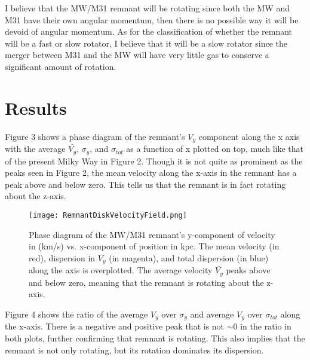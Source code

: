 \documentclass[twocolumn]{aastex63}
\begin{document}
I believe that the MW/M31 remnant will be rotating since both the MW and M31 have their own angular momentum, then there is no possible way it will be devoid of angular momentum.  As for the classification of whether the remnant will be a fast or slow rotator, I believe that it will be a slow rotator since the merger between M31 and the MW will have very little gas to conserve a significant amount of rotation.


\section{Results} \label{sec:style}


Figure 3 shows a phase diagram of the remnant's $V_y$ component along the x axis with the average $\bar{V_y}$, $\sigma_{y}$, and $\sigma_{tot}$ as a function of x plotted on top, much like that of the present Milky Way in Figure 2.  Though it is not quite as prominent as the peaks seen in Figure 2, the mean velocity along the x-axis in the remnant has a peak above and below zero.  This tells us that the remnant is in fact rotating about the z-axis.

\begin{figure}
    \centering
    \texttt{[image: RemnantDiskVelocityField.png]}
    \caption{Phase diagram of the MW/M31 remnant's y-component of velocity in (km/s) vs. x-component of position in kpc.  The mean velocity (in red), dispersion in $V_y$ (in magenta), and total dispersion (in blue) along the axis is overplotted.  The average velocity $\bar{V_y}$ peaks above and below zero, meaning that the remnant is rotating about the z-axis.}
    \label{fig:my_label}
\end{figure}

Figure 4 shows the ratio of the average $V_y$ over $\sigma_{y}$ and average $V_y$ over $\sigma_{tot}$ along the x-axis.  There is a negative and positive peak that is not $\sim$0 in the ratio in both plots, further confirming that remnant is rotating.  This also implies that the remnant is not only rotating, but its rotation dominates its dispersion.
\end{document}
